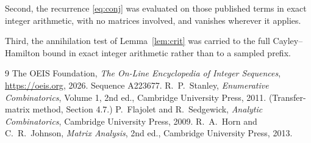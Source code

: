 \documentclass[11pt,a4paper]{article}
\theoremstyle{plain}
\theoremstyle{definition}
\begin{document}
Second, the recurrence \eqref{eq:conj} was evaluated on those published terms in exact
integer arithmetic, with no matrices involved, and vanishes wherever it applies.

Third, the annihilation test of Lemma~\ref{lem:crit} was carried to the full
Cayley--Hamilton bound in exact integer arithmetic rather than to a sampled prefix.

\begin{thebibliography}{9}
 The OEIS Foundation, \emph{The On-Line Encyclopedia of Integer
Sequences}, \url{https://oeis.org}, 2026. Sequence A223677.
 R.~P.~Stanley, \emph{Enumerative Combinatorics}, Volume 1, 2nd ed.,
Cambridge University Press, 2011. (Transfer-matrix method, Section 4.7.)
 P.~Flajolet and R.~Sedgewick, \emph{Analytic Combinatorics}, Cambridge
University Press, 2009.
 R.~A.~Horn and C.~R.~Johnson, \emph{Matrix Analysis}, 2nd ed., Cambridge
University Press, 2013.
\end{thebibliography}
\end{document}
